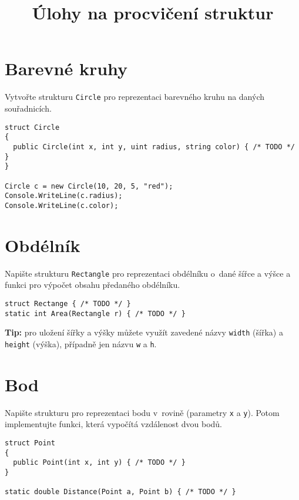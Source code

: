\documentclass[12pt,a4paper]{article}
\begin{document}
\pagestyle{empty}
\title{Úlohy na procvičení struktur}
\date{\vspace{-12ex}}
\setlength{\droptitle}{-6em}
\setlength{\parindent}{0cm}
\maketitle

\section{Barevné kruhy}

Vytvořte strukturu \texttt{Circle} pro reprezentaci barevného kruhu na daných
souřadnicích.

\begin{verbatim}
struct Circle
{
  public Circle(int x, int y, uint radius, string color) { /* TODO */ }
}

Circle c = new Circle(10, 20, 5, "red");
Console.WriteLine(c.radius);
Console.WriteLine(c.color);
\end{verbatim}


\section{Obdélník}

Napište strukturu \texttt{Rectangle} pro reprezentaci obdélníku o dané šířce a
výšce a funkci pro výpočet obsahu předaného obdélníku.

\begin{verbatim}
struct Rectange { /* TODO */ }
static int Area(Rectangle r) { /* TODO */ }
\end{verbatim}

\textbf{Tip:} pro uložení šířky a výšky můžete využít zavedené názvy
\texttt{width} (šířka) a \texttt{height} (výška), případně jen názvu
\texttt{w} a \texttt{h}.

\section{Bod}

Napište strukturu pro reprezentaci bodu v rovině (parametry \texttt{x} a
\texttt{y}). Potom implementujte funkci, která vypočítá vzdálenost dvou bodů.

\begin{verbatim}
struct Point
{
  public Point(int x, int y) { /* TODO */ }
}

static double Distance(Point a, Point b) { /* TODO */ }
\end{verbatim}
\end{document}
